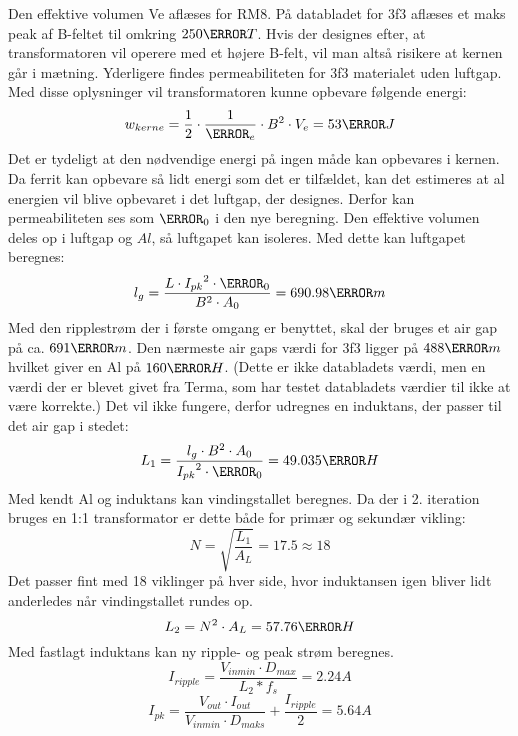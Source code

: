 \noindent Den effektive volumen Ve aflæses for RM8. På databladet for 3f3 aflæses et maks peak af B-feltet til omkring $250\milli T$. Hvis der designes efter, at transformatoren vil operere med et højere B-felt, vil man altså risikere at kernen går i mætning. Yderligere findes permeabiliteten for 3f3 materialet uden luftgap. Med disse oplysninger vil transformatoren kunne opbevare følgende energi:
\begin{equation} \label{Energy_no_gap}
w_{kerne} = \frac{1} {2} \cdot \frac{1}{\micro_e} \cdot B^2 \cdot V_e = 53\pico J
\end{equation}
Det er tydeligt at den nødvendige energi på ingen måde kan opbevares i kernen. Da ferrit kan opbevare så lidt energi som det er tilfældet, kan det estimeres at al energien vil blive opbevaret i det luftgap, der designes. Derfor kan permeabiliteten ses som $\micro_0$ i den nye beregning. Den effektive volumen deles op i luftgap og $Al$, så luftgapet kan isoleres. Med dette kan luftgapet beregnes: 
\begin{equation} \label{Airgap}
l_g = \frac{L \cdot {I_{pk}}^2 \cdot \micro_0}{B^2 \cdot A_0} = 690.98\micro m
\end{equation}
Med den ripplestrøm der i første omgang er benyttet, skal der bruges et air gap på ca. $691\micro m$. Den nærmeste air gaps værdi for 3f3 ligger på $488\micro m$ hvilket giver en Al på $160\nano H$. (Dette er ikke databladets værdi, men en værdi der er blevet givet fra Terma, som har testet databladets værdier til ikke at være korrekte.) Det vil ikke fungere, derfor udregnes en induktans, der passer til det air gap i stedet: 
\begin{equation}
L_1 = \frac{l_g \cdot B^2 \cdot A_0}{{I_{pk}}^2 \cdot \micro_0} = 49.035\micro H
\end{equation}
Med kendt Al og induktans kan vindingstallet beregnes. Da der i 2. iteration bruges en 1:1 transformator er dette både for primær og sekundær vikling:
\begin{equation} \label{N}
N = \sqrt{\frac{L_1}{A_L}} = 17.5 \approx 18
\end{equation}
Det passer fint med 18 viklinger på hver side, hvor induktansen igen bliver lidt anderledes når vindingstallet rundes op. 
\begin{equation} \label{L1}
L_2 = N^2 \cdot A_L = 57.76 \micro H
\end{equation}
Med fastlagt induktans kan ny ripple- og peak strøm beregnes.
\begin{equation}
I_{ripple} = \frac{V_{inmin} \cdot D_{max}}{L_2*f_s} = 2.24A
\end{equation}
\begin{equation}
I_{pk} = \frac{V_{out} \cdot I_{out}}{V_{inmin} \cdot D_{maks}} + \frac{I_{ripple}}{2} = 5.64A
\end{equation}


